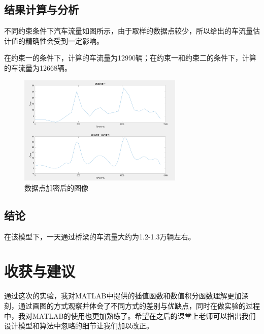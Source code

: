 \documentclass{article}
\begin{document}
\subsection{结果计算与分析}
不同约束条件下汽车流量如图所示，由于取样的数据点较少，所以给出的车流量估计值的精确性会受到一定影响。

在约束一的条件下，计算的车流量为12990辆；在约束一和约束二的条件下，计算的车流量为12668辆。
\begin{figure}[htb]
    \centering
    \includegraphics[width=0.7\textwidth]{pic2.png}
    \caption{数据点加密后的图像}
\end{figure}

\subsection{结论}
在该模型下，一天通过桥梁的车流量大约为1.2-1.3万辆左右。

\section{收获与建议}

通过这次的实验，我对MATLAB中提供的插值函数和数值积分函数理解更加深刻，通过画图的方式观察并体会了不同方式的差别与优缺点，同时在做实验的过程中，我对MATLAB的使用也更加熟练了。希望在之后的课堂上老师可以指出我们设计模型和算法中忽略的细节让我们加以改正。
\end{document}
